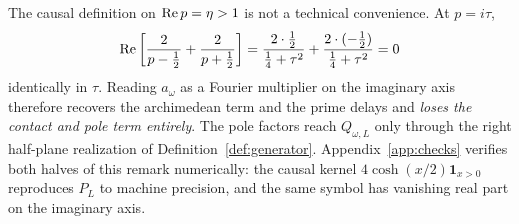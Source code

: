\begin{remark}\label{rem:imaginary}
The causal definition on $\operatorname{Re} p=\eta>1$ is not a technical convenience. At
$p=i\tau$,
\[
 \operatorname{Re}\left[\frac2{p-\frac12}+\frac2{p+\frac12}\right]
 =\frac{2\cdot\frac12}{\frac14+\tau^2}+\frac{2\cdot(-\frac12)}{\frac14+\tau^2}
 =0
\]
identically in $\tau$. Reading $a_\omega$ as a Fourier multiplier on the
imaginary axis therefore recovers the archimedean term and the prime delays and
\emph{loses the contact and pole term entirely}. The pole factors reach
$Q_{\omega,L}$ only through the right half-plane realization of
Definition~\ref{def:generator}. Appendix~\ref{app:checks} verifies both halves of
this remark numerically: the causal kernel $4\cosh(x/2)\mathbf1_{x>0}$
reproduces $P_L$ to machine precision, and the same symbol has vanishing real
part on the imaginary axis.
\end{remark}
